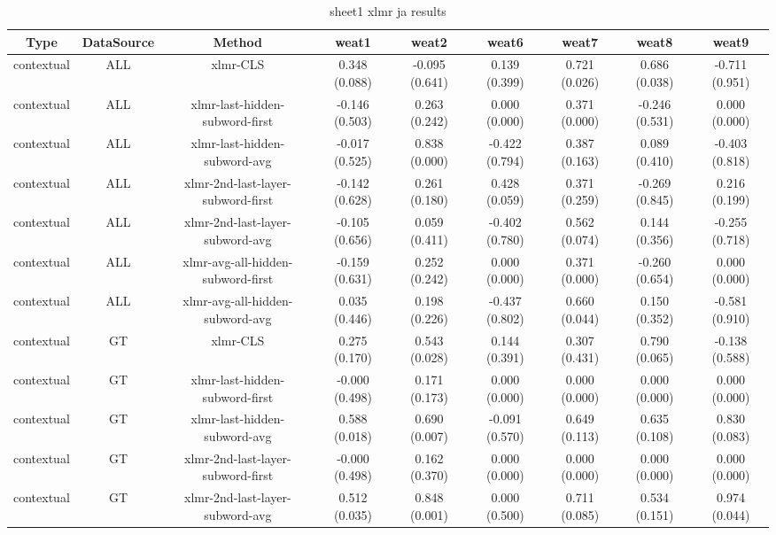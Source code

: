 \begin{sidewaystable}[htb]
    \centering
    \caption{sheet1 xlmr ja results}
    \label{appendix_tab:sheet1_xlmr_ja_results}
    \small
    \begin{tabular}{@{}ccccccccc@{}}
        \toprule
        Type & DataSource & Method & weat1 & weat2 & weat6 & weat7 & weat8 & weat9 \\
        \midrule
        contextual & ALL & xlmr-CLS & 0.348 (0.088) & -0.095 (0.641) & 0.139 (0.399) & 0.721 (0.026) & 0.686 (0.038) & -0.711 (0.951) \\
        contextual & ALL & xlmr-last-hidden-subword-first & -0.146 (0.503) & 0.263 (0.242) & 0.000 (0.000) & 0.371 (0.000) & -0.246 (0.531) & 0.000 (0.000) \\
        contextual & ALL & xlmr-last-hidden-subword-avg & -0.017 (0.525) & 0.838 (0.000) & -0.422 (0.794) & 0.387 (0.163) & 0.089 (0.410) & -0.403 (0.818) \\
        contextual & ALL & xlmr-2nd-last-layer-subword-first & -0.142 (0.628) & 0.261 (0.180) & 0.428 (0.059) & 0.371 (0.259) & -0.269 (0.845) & 0.216 (0.199) \\
        contextual & ALL & xlmr-2nd-last-layer-subword-avg & -0.105 (0.656) & 0.059 (0.411) & -0.402 (0.780) & 0.562 (0.074) & 0.144 (0.356) & -0.255 (0.718) \\
        contextual & ALL & xlmr-avg-all-hidden-subword-first & -0.159 (0.631) & 0.252 (0.242) & 0.000 (0.000) & 0.371 (0.000) & -0.260 (0.654) & 0.000 (0.000) \\
        contextual & ALL & xlmr-avg-all-hidden-subword-avg & 0.035 (0.446) & 0.198 (0.226) & -0.437 (0.802) & 0.660 (0.044) & 0.150 (0.352) & -0.581 (0.910) \\
        contextual & GT & xlmr-CLS & 0.275 (0.170) & 0.543 (0.028) & 0.144 (0.391) & 0.307 (0.431) & 0.790 (0.065) & -0.138 (0.588) \\
        contextual & GT & xlmr-last-hidden-subword-first & -0.000 (0.498) & 0.171 (0.173) & 0.000 (0.000) & 0.000 (0.000) & 0.000 (0.000) & 0.000 (0.000) \\
        contextual & GT & xlmr-last-hidden-subword-avg & 0.588 (0.018) & 0.690 (0.007) & -0.091 (0.570) & 0.649 (0.113) & 0.635 (0.108) & 0.830 (0.083) \\
        contextual & GT & xlmr-2nd-last-layer-subword-first & -0.000 (0.498) & 0.162 (0.370) & 0.000 (0.000) & 0.000 (0.000) & 0.000 (0.000) & 0.000 (0.000) \\
        contextual & GT & xlmr-2nd-last-layer-subword-avg & 0.512 (0.035) & 0.848 (0.001) & 0.000 (0.500) & 0.711 (0.085) & 0.534 (0.151) & 0.974 (0.044) \\

\end{tabular}
\end{sidewaystable}
